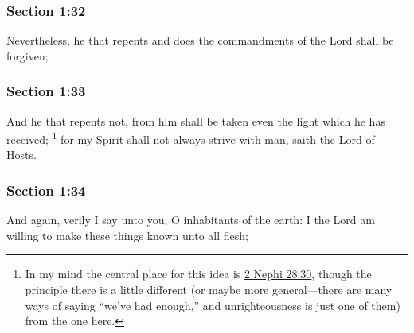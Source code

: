 	\subsubsection{Section 1:32} %
		\label{DC1-32}

		Nevertheless, he that repents and does the commandments of the Lord shall be forgiven;


	\subsubsection{Section 1:33} %
		\label{DC1-33}

		And he that repents not, from him shall be taken even the light which he has received;%
			\footnote{%
				In my mind the central place for this idea is \hyperref[2NEPHI-28-30]{2 Nephi 28:30}, though the principle there is a little different (or maybe more general---there are many ways of saying ``we've had enough,'' and unrighteousness is just one of them) from the one here.
				}
		for my Spirit shall not always strive with man, saith the Lord of Hosts.


	\subsubsection{Section 1:34} %
		\label{DC1-34}

		And again, verily I say unto you, O inhabitants of the earth: I the Lord am willing to make these things known unto all flesh;


